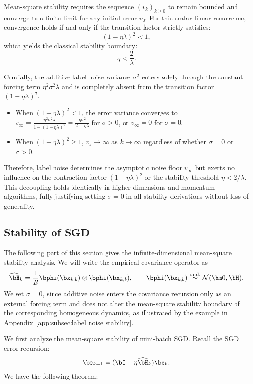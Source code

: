 Mean-square stability requires the sequence $(v_k)_{k \ge 0}$ to remain bounded and converge to a finite limit for any initial error $v_0$. For this scalar linear recurrence, convergence holds if and only if the transition factor strictly satisfies:
\[
    (1 - \eta \lambda)^2 < 1,
\]
which yields the classical stability boundary:
\[
    \eta < \frac{2}{\lambda}.
\]

Crucially, the additive label noise variance $\sigma^2$ enters solely through the constant forcing term $\eta^2 \sigma^2 \lambda$ and is completely absent from the transition factor $(1 - \eta \lambda)^2$:
\begin{itemize}
    \item When $(1 - \eta \lambda)^2 < 1$, the error variance converges to $v_\infty = \frac{\eta^2 \sigma^2 \lambda}{1 - (1-\eta\lambda)^2} = \frac{\eta \sigma^2}{2 - \eta\lambda}$ for $\sigma > 0$, or $v_\infty = 0$ for $\sigma = 0$.
    \item When $(1 - \eta \lambda)^2 \ge 1$, $v_k \to \infty$ as $k \to \infty$ regardless of whether $\sigma = 0$ or $\sigma > 0$.
\end{itemize}

Therefore, label noise determines the asymptotic noise floor $v_\infty$ but exerts no influence on the contraction factor $(1 - \eta \lambda)^2$ or the stability threshold $\eta < 2/\lambda$. This decoupling holds identically in higher dimensions and momentum algorithms, fully justifying setting $\sigma = 0$ in all stability derivations without loss of generality.


\subsection{Stability of SGD}
\label{app:subsec:sgd_stability}

The following part of this section gives the infinite-dimensional mean-square stability analysis. We will write the empirical covariance operator as
\[ \widehat{\bH}_k=\frac1B\bphi(\bx_{k,b})\otimes\bphi(\bx_{k,b}),\qquad\bphi(\bx_{k,b})\overset{\mathrm{i.i.d.}}{\sim}\mathcal N(\bm0,\bH).
\]
We set $\sigma=0$, since additive noise enters the covariance recursion only as an external forcing term and does not alter the mean-square stability boundary of the corresponding homogeneous dynamics, as illustrated by the example in Appendix~\ref{app:subsec:label noise stability}.

We first analyze the mean-square stability of mini-batch SGD. Recall the SGD error recursion:
\begin{equation}
    \be_{k+1}
=
(\bI-\eta\widehat{\bH}_k)\be_k.
\label{app:eq:sgd-error-update}
\end{equation}
We have the following theorem:

